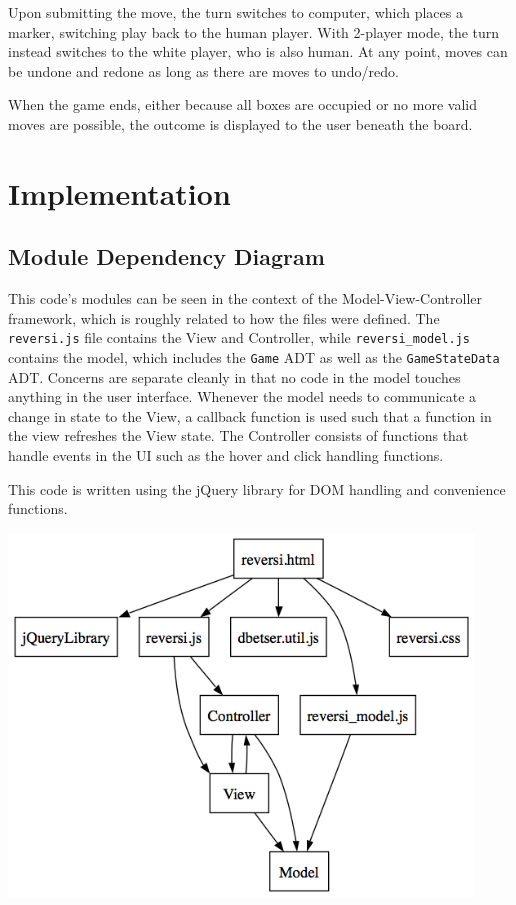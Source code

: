 \documentclass[11pt,letterpaper]{article}
\begin{document}
Upon submitting the move, the turn switches to computer, which places a marker, switching play back to the human player. With 2-player mode, the turn instead switches to the white player, who is also human. At any point, moves can be undone and redone as long as there are moves to undo/redo.

When the game ends, either because all boxes are occupied or no more valid moves are possible, the outcome is displayed to the user beneath the board.

\section{Implementation}

\subsection{Module Dependency Diagram}
This code's modules can be seen in the context of the Model-View-Controller framework, which is roughly related to how the files were defined. The \texttt{reversi.js} file contains the View and Controller, while \texttt{reversi\_model.js} contains the model, which includes the \texttt{Game} ADT as well as the \texttt{GameStateData} ADT. Concerns are separate cleanly in that no code in the model touches anything in the user interface. Whenever the model needs to communicate a change in state to the View, a callback function is used such that a function in the view refreshes the View state. The Controller consists of functions that handle events in the UI such as the hover and click handling functions. 

This code is written using the jQuery library for DOM handling and convenience functions.

\begin{center}
\includegraphics[width=350pt]{dot/moddepdiagram.png}
\label{fig:ob2} 
\end{center}
\end{document}
